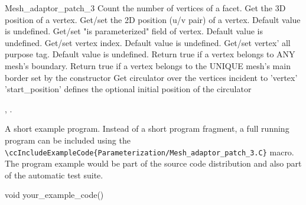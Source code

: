 \begin{ccRefClass}{Mesh_adaptor_patch_3}
{
}
{
Count the number of vertices of a facet.
}
{
Get the 3D position of a vertex.
}
{
Get/set the 2D position (u/v pair) of a vertex. Default value is undefined.
}
{
}
{
Get/set "is parameterized" field of vertex. Default value is undefined.
}
{
}
{
Get/set vertex index. Default value is undefined.
}
{
}
{
Get/set vertex' all purpose tag. Default value is undefined.
}
{
}
{
Return true if a vertex belongs to ANY mesh's boundary.
}
{
Return true if a vertex belongs to the UNIQUE mesh's main border set by the constructor
}
{
Get circulator over the vertices incident to 'vertex' 'start\_position' defines the optional initial position of the circulator
}
{
}


\ccSeeAlso

,
.

\ccExample

A short example program.
Instead of a short program fragment, a full running program can be
included using the 
\verb|\ccIncludeExampleCode{Parameterization/Mesh_adaptor_patch_3.C}| 
macro. The program example would be part of the source code distribution and
also part of the automatic test suite.

\begin{ccExampleCode}
void your_example_code() {
}
\end{ccExampleCode}


\end{ccRefClass}


